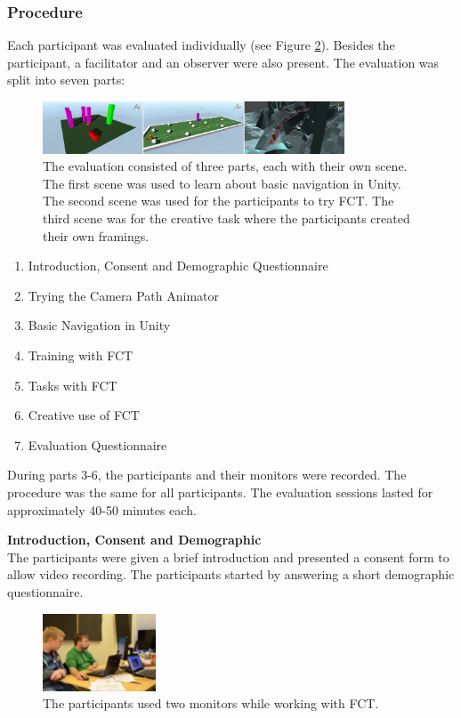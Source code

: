 \subsubsection{Procedure}
Each participant was evaluated individually (see Figure \ref{fig:tt}). Besides the participant, a facilitator and an observer were also present. The evaluation was split into seven parts: 
\begin{figure}[hbtp]
\centering
\includegraphics[width=0.8\textwidth]{Pics/sceneAll_horizontal}
\caption{The evaluation consisted of three parts, each with their own scene. The first scene was used to learn about basic navigation in Unity. The second scene was used for the participants to try FCT. The third scene was for the creative task where the participants created their own framings.}
\label{fig:sceneAll}
\end{figure}

\begin{enumerate}
\item Introduction, Consent and Demographic Questionnaire
\item Trying the Camera Path Animator
\item Basic Navigation in Unity
\item Training with FCT
\item Tasks with FCT
\item Creative use of FCT
\item Evaluation Questionnaire
\end{enumerate}

During parts 3-6, the participants and their monitors were recorded. The procedure was the same for all participants. The evaluation sessions lasted for approximately 40-50 minutes each. 

\textbf{Introduction, Consent and Demographic}\\
The participants were given a brief introduction and presented a consent form to allow video recording. The participants started by answering a short demographic questionnaire. 

\begin{figure}[htbp]
\centering
\includegraphics[width=0.3\textwidth]{Pics/test_setup}
\caption{The participants used two monitors while working with FCT.}
\label{fig:tt}
\end{figure}

